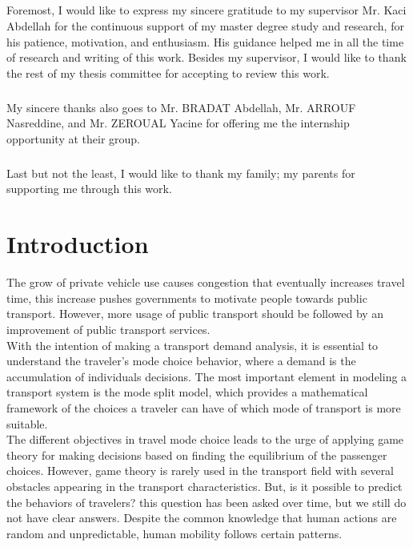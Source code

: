 \documentclass[12pt]{report}
\begin{document}
\paragraph{}
Foremost, I would like to express my sincere gratitude to my supervisor Mr. Kaci Abdellah for the continuous support of my master degree study and research, for his patience, motivation, and enthusiasm. His guidance helped me in all the time of research and writing of this work.
Besides my supervisor, I would like to thank the rest of my thesis committee for accepting to review this work.
\paragraph{}
My sincere thanks also goes to Mr. BRADAT Abdellah, Mr. ARROUF Nasreddine, and Mr.  ZEROUAL Yacine for offering me the internship opportunity at their group.
\paragraph{}
Last but not the least, I would like to thank my family; my parents for supporting me through this work. 


\tableofcontents
\listoffigures
\listoftables


\clearpage


\chapter*{Introduction}
\setcounter{page}{1}
The grow of private vehicle use causes congestion that eventually  increases travel time, this increase pushes governments to motivate people towards public transport. However, more usage of public transport should be followed by an improvement of public transport services.\\

With the intention of making a transport demand analysis, it is essential to understand the traveler's mode choice behavior, where a demand is the accumulation of individuals decisions. The most important element in modeling a transport system is the mode split model, which provides a mathematical framework of the choices a traveler can have of which mode of transport is more suitable.\\

The different objectives in travel mode choice leads to the urge of applying game theory for making decisions based on finding the equilibrium of the passenger choices. However, game theory is rarely used in the transport field with several obstacles appearing in the transport characteristics. But, is it possible to predict the behaviors of travelers? this question has been asked over time, but we still do not have clear answers. Despite the common knowledge that human actions are random and unpredictable, human mobility follows certain patterns.\\
\end{document}
